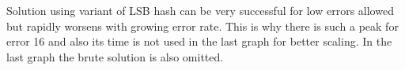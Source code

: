 Solution using variant of LSB hash can be very successful for low errors allowed but rapidly worsens with growing error rate. This is why there is such a peak for error 16 and also its time is not used in the last graph for better scaling. In the last graph the brute solution is also omitted.

\begin{figure}
\begin{minipage}{.5\linewidth}
\centering
{}
\end{minipage}%
\begin{minipage}{.5\linewidth}
\centering
{}
\end{minipage}\par\medskip


\end{figure}
